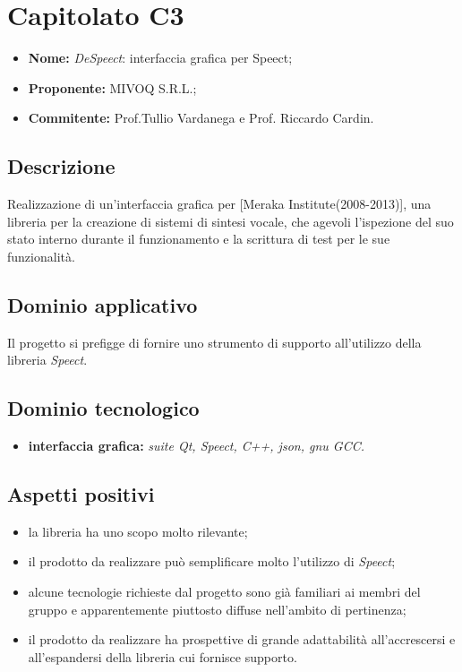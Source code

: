 \documentclass[openany,12pt,a4paper]{report}
\begin{document}
	\section{Capitolato C3}

	\begin{itemize}
		\item \textbf{Nome:} \textit{DeSpeect}: interfaccia grafica per Speect;
		\item \textbf{Proponente:} MIVOQ S.R.L.;
		\item \textbf{Commitente:} Prof.Tullio Vardanega e Prof. Riccardo Cardin.
	\end{itemize}

	\subsection{Descrizione}

	Realizzazione di un'interfaccia grafica per  [Meraka Institute(2008-2013)], una libreria per la creazione di sistemi di sintesi vocale, che agevoli l’ispezione del suo stato interno durante il funzionamento e la scrittura di test per le sue funzionalità.


	\subsection{Dominio applicativo}

	Il progetto si prefigge di fornire uno strumento di supporto all'utilizzo della libreria \textit{Speect}.

	\subsection{Dominio tecnologico}

	\begin{itemize}
		\item \textbf{interfaccia grafica:} \textit{suite Qt, Speect, C++, json, gnu GCC.}
	\end{itemize}

	\subsection{Aspetti positivi}

	\begin{itemize}
		\item la libreria ha uno scopo molto rilevante;

		\item il prodotto da realizzare può semplificare molto l'utilizzo di \textit{Speect};

		\item alcune tecnologie richieste dal progetto sono già familiari ai membri del gruppo e apparentemente piuttosto diffuse nell'ambito di pertinenza;

		\item il prodotto da realizzare ha prospettive di grande adattabilità all'accrescersi e all'espandersi della libreria cui fornisce supporto.
	\end{itemize}
\end{document}
